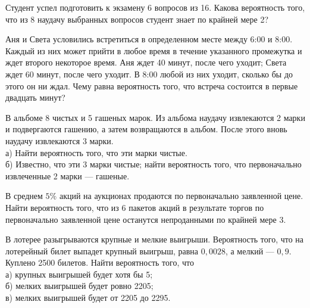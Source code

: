 \newpage\setcounter{zad}{0}



\begin{zkrW}{20}\noindent 
	Студент успел подготовить к экзамену 6 вопросов из 16. Какова вероятность того, что из 8 наудачу выбранных вопросов студент знает по крайней мере 2?
 
\end{zkrW}

\begin{zkrW}{20}\noindent 
	Аня и Света условились встретиться в определенном месте между 6:00 и 8:00. Каждый из них может прийти в любое время в течение указанного промежутка и ждет второго некоторое время. Аня ждет 40 минут, после чего уходит; Света ждет 60 минут, после чего уходит. В 8:00 любой из них уходит, сколько бы до этого он ни ждал. Чему равна вероятность того, что встреча состоится в первые двадцать минут?
 
\end{zkrW}

\begin{zkrW}{20}\noindent 
	В альбоме 8 чистых и 5 гашеных марок. Из альбома наудачу извлекаются 2 марки и подвергаются гашению, а затем возвращаются в альбом. После этого вновь наудачу извлекаются 3 марки. \\ \indent а) Найти вероятность того, что эти марки чистые. \\ \indent б) Известно, что эти 3 марки чистые; найти вероятность того, что первоначально извлеченные 2 марки --- гашеные.
 
\end{zkrW}

\begin{zkrW}{20}\noindent 
	В среднем $5\%$ акций на аукционах продаются по первоначально заявленной цене. Найти вероятность того, что из 6 пакетов акций в результате торгов по первоначально заявленной цене останутся непроданными по крайней мере 3.
 
\end{zkrW}

\begin{zkrW}{20}\noindent 
	В лотерее разыгрываются крупные и мелкие выигрыши. Вероятность того, что на лотерейный билет выпадет крупный выигрыш, равна $0{,}0028$, а мелкий --- $0{,}9$. Куплено 2500 билетов. Найти вероятность того, что \\ \indent а) крупных выигрышей будет хотя бы 5; \\ \indent б) мелких выигрышей будет ровно 2205; \\ \indent в) мелких выигрышей будет от 2205 до 2295.
 
\end{zkrW}

